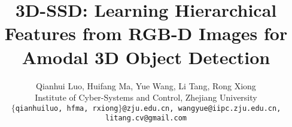 \documentclass[10pt,twocolumn,letterpaper]{article}
\begin{document}
	
	\title{3D-SSD: Learning Hierarchical Features from RGB-D Images for Amodal 3D Object Detection}
	
	\author{Qianhui Luo, Huifang Ma, Yue Wang, Li Tang, Rong Xiong\\
		Institute of Cyber-Systems and Control, Zhejiang University\\
		{\tt\small $\{$qianhuiluo, hfma, rxiong$\}$@zju.edu.cn, wangyue@iipc.zju.edu.cn, litang.cv@gmail.com}
		\and
	}
	
	\maketitle
	
\end{document}
